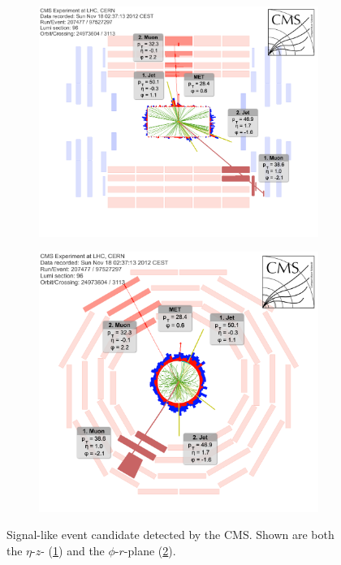\begin{figure}[!htbp]
  \centering
  \begin{subfigure}[b]{0.75\textwidth}
    \centering
    \includegraphics[width=\textwidth]{plots/event_display_eta_z.png}
    \caption{\label{fig:evt-eta-z}}
  \end{subfigure}
  \begin{subfigure}[b]{0.75\textwidth}
    \centering
    \includegraphics[width=\textwidth]{plots/event_display_phi_r.png}
    \caption{\label{fig:evt-phi-r}}
  \end{subfigure}
  \caption{Signal-like event candidate detected by the CMS. Shown are both the $\eta$-$z$- (\ref{fig:evt-eta-z}) and the $\phi$-$r$-plane (\ref{fig:evt-phi-r}).}
  \label{fig:evt-display}
\end{figure}


